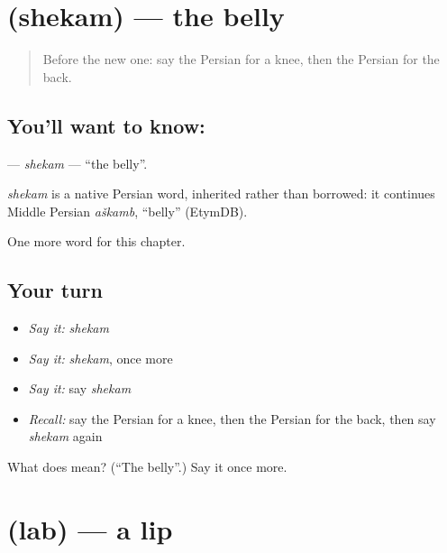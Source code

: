 \section[\texorpdfstring{\fa{شکم} (shekam)}{شکم (shekam)}]{ (shekam) — the belly}

\label{lesson:FA-C29-shekam}



\begin{quote}
Before the new one: say the Persian for a knee, then the Persian for the back.
\end{quote}

\subsection*{You'll want to know: }
\textbf{} — \emph{shekam} — \textquotedblleft{}the belly\textquotedblright{}.

\begin{cousinweb}
\emph{shekam} is a native Persian word, inherited rather than borrowed: it continues Middle Persian \emph{aškamb}, \textquotedblleft{}belly\textquotedblright{} (EtymDB).
\end{cousinweb}

\begin{grammarlens}[title={What you've built}]
One more word for this chapter.
\end{grammarlens}

\subsection*{Your turn}
\begin{itemize}
\raggedright
  \item \emph{Say it:} \emph{shekam}
  \item \emph{Say it:} \emph{shekam}, once more
  \item \emph{Say it:} say \emph{shekam}
  \item \emph{Recall:} say the Persian for a knee, then the Persian for the back, then say \emph{shekam} again
\end{itemize}

\begin{tcolorbox}[breakable,colback=teal!4,colframe=teal!35!black,title={Before you move on}]
What does  mean? (\textquotedblleft{}The belly\textquotedblright{}.) Say it once more.
\end{tcolorbox}
\section[\texorpdfstring{\fa{لب} (lab)}{لب (lab)}]{ (lab) — a lip}

